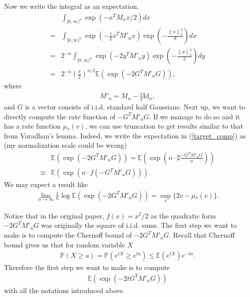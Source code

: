 \documentclass[10pt]{article}
\newcommand{\e}{\mathbb{E}}
\newcommand{\p}{\mathbb{P}}
\newcommand{\norm}[1]{\left\lVert#1\right\rVert}
\newenvironment{Proof of lemma}{\noindent{\bf Proof of Lemma}}{\hfill$\Box$\newline}
\newenvironment{Proof of claim}{\noindent{\bf Proof of claim}}{\hfill$\Box$\newline}
\newenvironment{Proof of theorem}{\noindent{\bf Proof of Theorem}}{\hfill\scriptsize{$\Box$}\newline}
\newenvironment{Proof of theorems}{\noindent{\bf Proof of Theorems}}{\hfill$\Box$\newline}
\newenvironment{Proof of proposition}{\noindent{\bf Proof of Proposition}}{\hfill$\Box$\newline}
\newenvironment{Proof of propositions}{\noindent{\bf Proof of Propositions}}{\hfill$\Box$\newline}
\newenvironment{Proof of exercise}{\noindent{\it Proof of Exercise:}}{\hfill$\Box$}
\begin{document}
Now we write the integral as an expectation.
\begin{align} \label{target_comp}
    &\int_{[0,\infty)^n} \exp \left(-x^T M_n x/2\right)dx \nonumber \\
    =&\int_{[0,\infty)^n} \exp \left(-\frac{1}{2}x^T M'_n x\right) \exp\left(-\frac{\norm{x}_2^2}{8}\right)dx \nonumber \\
    =&2^{-n}\int_{[0,\infty)^n} \exp \left(-2y^T M'_n y\right) \exp\left(-\frac{\norm{y}_2^2}{2}\right)dy \nonumber \\
    =&2^{-n}\left(\frac{\pi}{2}\right)^{n/2} \e \left( \exp \left(-2G^T M'_n G\right) \right),
\end{align}
where
\begin{align}
    M'_n = M_n - \frac{1}{4} \text{Id}_n,
\end{align}
and $G$ is a vector consists of i.i.d. standard half Gaussians. Next up, we want to directly compute the rate function of $-G^T M'_n G$. If we manage to do so and it has a rate function $\mu_*(v)$, we can use truncation to get results similar to that from Varadhan's lemma. Indeed, we write the expectation in (\ref{target_comp}) as (my normalization scale could be wrong)
\begin{align}
    &\e \left( \exp \left(-2G^T M'_n G\right) \right) = \e \left( \exp \left(n \cdot 2\frac{-G^T M'_n G}{n}\right) \right) \nonumber \\
    \equiv& \e \left( \exp \left(n \cdot f(-G^T M'_n G)\right) \right).
\end{align}
We may expect a result like
\begin{align}
    \lim_{n \to \infty} \frac{1}{n} \log \e \left( \exp \left(-2G^T M'_n G\right) \right) = \sup_{v}\{2v - \mu_*(v)\}.
\end{align}

Notice that in the original paper, $f(x)=x^2/2$ as the quadratic form $-2G^T M'_n G$ was originally the square of i.i.d. sums. The first step we want to make is to compute the Chernoff bound of $-2G^T M'_n G$. Recall that Chernoff bound gives us that for random variable $X$
\begin{align}
    \p(X \geq a) = \p(e^{tX} \geq e^{ta}) \leq \e(e^{tX})e^{-ta}.
\end{align}
Therefore the first step we want to make is to compute
\begin{align}
    \e \left(\exp(-2tG^T M'_n G)\right)
\end{align}
with all the notations introduced above.
\end{document}

